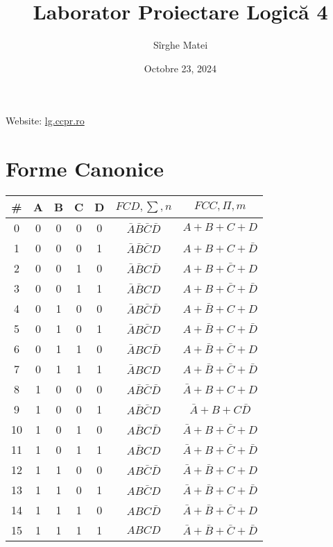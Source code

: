 \documentclass[12pt]{article}
\title{\bfseries Laborator Proiectare Logică 4}
\author{Sîrghe Matei}
\date{Octobre 23, 2024}
\begin{document}
\maketitle

Website: \href{https://lg.ccpr.ro/}{lg.ccpr.ro}

\section{Forme Canonice}

\renewcommand{\arraystretch}{1.1}

\begin{table}[h!]
    \centering
    \begin{tabular}{|c|c|c|c|c|c|c|}
        \hline
        \# & A & B & C & D & $FCD,\sum,n$ & $FCC,\Pi,m$ \\ \hline
        0 & 0 & 0 & 0 & 0 & $\bar{A}\bar{B}\bar{C}\bar{D}$ & $A+B+C+D$ \\ \hline
        1 & 0 & 0 & 0 & 1 & $\bar{A}\bar{B}\bar{C}D$ & $A+B+C+\bar{D}$ \\ \hline
        2 & 0 & 0 & 1 & 0 & $\bar{A}\bar{B}C\bar{D}$ & $A+B+\bar{C}+D$ \\ \hline
        3 & 0 & 0 & 1 & 1 & $\bar{A}\bar{B}CD$ & $A+B+\bar{C}+\bar{D}$ \\ \hline
        4 & 0 & 1 & 0 & 0 & $\bar{A}B\bar{C}\bar{D}$ & $A+\bar{B}+C+D$ \\ \hline
        5 & 0 & 1 & 0 & 1 & $\bar{A}B\bar{C}D$ & $A+\bar{B}+C+\bar{D}$ \\ \hline
        6 & 0 & 1 & 1 & 0 & $\bar{A}BC\bar{D}$ & $A+\bar{B}+\bar{C}+D$ \\ \hline
        7 & 0 & 1 & 1 & 1 & $\bar{A}BCD$ & $A+\bar{B}+\bar{C}+\bar{D}$ \\ \hline
        8 & 1 & 0 & 0 & 0 & $A\bar{B}\bar{C}\bar{D}$ & $\bar{A}+B+C+D$ \\ \hline
        9 & 1 & 0 & 0 & 1 & $A\bar{B}\bar{C}D$ & $\bar{A}+B+C\bar{D}$ \\ \hline
        10 & 1 & 0 & 1 & 0 & $A\bar{B}C\bar{D}$ & $\bar{A}+B+\bar{C}+D$ \\ \hline
        11 & 1 & 0 & 1 & 1 & $A\bar{B}CD$ & $\bar{A}+B+\bar{C}+\bar{D}$ \\ \hline
        12 & 1 & 1 & 0 & 0 & $AB\bar{C}\bar{D}$ & $\bar{A}+\bar{B}+C+D$ \\ \hline
        13 & 1 & 1 & 0 & 1 & $AB\bar{C}D$ & $\bar{A}+\bar{B}+C+\bar{D}$ \\ \hline
        14 & 1 & 1 & 1 & 0 & $ABC\bar{D}$ & $\bar{A}+\bar{B}+\bar{C}+D$ \\ \hline
        15 & 1 & 1 & 1 & 1 & $ABCD$ & $\bar{A}+\bar{B}+\bar{C}+\bar{D}$ \\ \hline
    \end{tabular}
\end{table}
\end{document}
